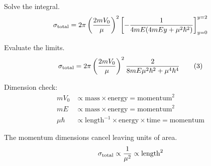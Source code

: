 Solve the integral.
\begin{equation*}
\sigma_{\rm total}=2\pi\left(\frac{2mV_0}{\mu}\right)^2
\left[-\frac{1}{4mE(4mEy+\mu^2\hbar^2)}\right]_{y=0}^{y=2}
\end{equation*}

Evaluate the limits.
\begin{equation*}
\sigma_{\rm total}=2\pi\left(\frac{2mV_0}{\mu}\right)^2
\frac{2}{8mE\mu^2\hbar^2+\mu^4\hbar^4}
\tag{3}
\end{equation*}

Dimension check:
\begin{align*}
mV_0&\propto\text{mass}\times\text{energy}=\text{momentum}^2
\\
mE&\propto\text{mass}\times\text{energy}=\text{momentum}^2
\\
\mu\hbar&\propto\text{length}^{-1}\times\text{energy}\times\text{time}=\text{momentum}
\end{align*}

The momentum dimensions cancel leaving units of area.
\begin{equation*}
\sigma_{\rm total}\propto\frac{1}{\mu^2}\propto\text{length}^2
\end{equation*}


